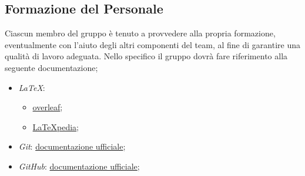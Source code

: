     \subsection{Formazione del Personale}
        Ciascun membro del gruppo è tenuto a provvedere alla propria formazione, eventualmente con l'aiuto degli altri componenti del team, al fine di garantire una qualità di lavoro adeguata.
        Nello specifico il gruppo dovrà fare riferimento alla seguente documentazione;
                \begin{itemize}
                    \item \textit{LaTeX}:
                        \begin{itemize}
                            \item  \href{https://www.overleaf.com/learn}{overleaf};
                            \item \href{http://www.lorenzopantieri.net/LaTeX_files/LaTeXpedia.pdf}{LaTeXpedia};
                        \end{itemize}
                    \item \textit{Git}: \href{https://git-scm.com/docs}{documentazione ufficiale};
                    \item \textit{GitHub}: \href{https://support.github.com}{documentazione ufficiale};
                \end{itemize}